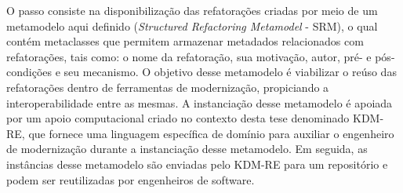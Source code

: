 





O passo  consiste na disponibilização das refatorações criadas por meio de um metamodelo aqui definido (\textit{Structured Refactoring Metamodel} - SRM), o qual contém metaclasses que permitem armazenar metadados relacionados com refatorações, tais como: o nome da refatoração, sua motivação, autor, pré- e pós-condições e seu mecanismo. O objetivo desse metamodelo é viabilizar o reúso das refatorações dentro de ferramentas de modernização, propiciando a interoperabilidade entre as mesmas. A instanciação desse metamodelo é apoiada por um apoio computacional criado no contexto desta tese denominado KDM-RE, que fornece uma linguagem específica de domínio para auxiliar o engenheiro de modernização durante a instanciação desse metamodelo. Em seguida, as instâncias desse metamodelo são enviadas pelo KDM-RE para um repositório e podem ser reutilizadas por engenheiros de software. 

